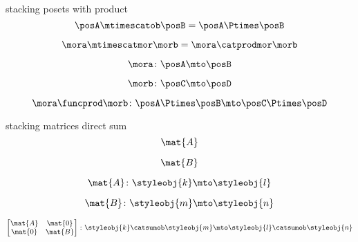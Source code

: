 {\begin{forslides}
        stacking posets with product
        \begin{equation}
            \label{eq:parallelism-019}
            \posA \mtimescatob \posB = \posA \Ptimes \posB
        \end{equation}

        \begin{equation}
            \label{eq:parallelism-020}
            \mora \mtimescatmor \morb = \mora \catprodmor \morb
        \end{equation}

        \begin{equation}
            \label{eq:parallelism-021}
            \mora \colon \posA \mto \posB
        \end{equation}

        \begin{equation}
            \label{eq:parallelism-022}
            \morb \colon \posC \mto \posD
        \end{equation}

        \begin{equation}
            \label{eq:parallelism-023}
            \mora \funcprod \morb \colon \posA \Ptimes \posB \mto \posC \Ptimes \posD
        \end{equation}

        stacking matrices direct sum
        \begin{equation}
            \label{eq:parallelism-024}
            \mat{A}
        \end{equation}

        \begin{equation}
            \label{eq:parallelism-025}
            \mat{B}
        \end{equation}

        \begin{equation}
            \label{eq:parallelism-026}
            \mat{A} \colon \styleobj{k} \mto \styleobj{l}
        \end{equation}

        \begin{equation}
            \label{eq:parallelism-027}
            \mat{B} \colon \styleobj{m} \mto \styleobj{n}
        \end{equation}

        \begin{equation}
            \label{eq:parallelism-028}
            \begin{bmatrix}
                \mat{A} & \mat{0} \\
                \mat{0} & \mat{B}
            \end{bmatrix}
            \colon \styleobj{k} \catsumob \styleobj{m} \mto \styleobj{l} \catsumob \styleobj{n}
        \end{equation}


\end{forslides}}
